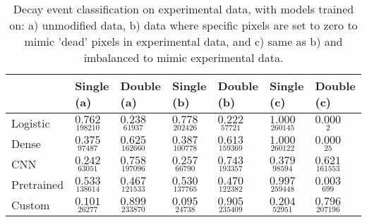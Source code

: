 \begin{table}
\centering
\caption{
Decay event classification on experimental data, with models trained on:
a) unmodified data, b) data where specific pixels are set to zero to mimic
'dead' pixels in experimental data, and c) same as b) and imbalanced to mimic experimental data.
}
\label{tab:classification-experimental-ratios}
\begin{tabular}{lllllll}
\toprule
{} &                                     Single (a) &                                     Double (a) &                                     Single (b) &                                     Double (b) &                                     Single (c) &                                     Double (c) \\
\midrule
Logistic   &  $\underset{\num{ 198210 }  }{\num{ 0.762 } }$ &  $\underset{\num{ 61937 }  }{\num{ 0.238 } }$ &  $\underset{\num{ 202426 }  }{\num{ 0.778 } }$ &  $\underset{\num{ 57721 }  }{\num{ 0.222 } }$ &  $\underset{\num{ 260145 }  }{\num{ 1.000 } }$ &  $\underset{\num{ 2 }  }{\num{ 0.000 } }$ \\
Dense      &  $\underset{\num{ 97487 }  }{\num{ 0.375 } }$ &  $\underset{\num{ 162660 }  }{\num{ 0.625 } }$ &  $\underset{\num{ 100778 }  }{\num{ 0.387 } }$ &  $\underset{\num{ 159369 }  }{\num{ 0.613 } }$ &  $\underset{\num{ 260122 }  }{\num{ 1.000 } }$ &  $\underset{\num{ 25 }  }{\num{ 0.000 } }$ \\
CNN        &  $\underset{\num{ 63051 }  }{\num{ 0.242 } }$ &  $\underset{\num{ 197096 }  }{\num{ 0.758 } }$ &  $\underset{\num{ 66790 }  }{\num{ 0.257 } }$ &  $\underset{\num{ 193357 }  }{\num{ 0.743 } }$ &  $\underset{\num{ 98594 }  }{\num{ 0.379 } }$ &  $\underset{\num{ 161553 }  }{\num{ 0.621 } }$ \\
Pretrained &  $\underset{\num{ 138614 }  }{\num{ 0.533 } }$ &  $\underset{\num{ 121533 }  }{\num{ 0.467 } }$ &  $\underset{\num{ 137765 }  }{\num{ 0.530 } }$ &  $\underset{\num{ 122382 }  }{\num{ 0.470 } }$ &  $\underset{\num{ 259448 }  }{\num{ 0.997 } }$ &  $\underset{\num{ 699 }  }{\num{ 0.003 } }$ \\
Custom     &  $\underset{\num{ 26277 }  }{\num{ 0.101 } }$ &  $\underset{\num{ 233870 }  }{\num{ 0.899 } }$ &  $\underset{\num{ 24738 }  }{\num{ 0.095 } }$ &  $\underset{\num{ 235409 }  }{\num{ 0.905 } }$ &  $\underset{\num{ 52951 }  }{\num{ 0.204 } }$ &  $\underset{\num{ 207196 }  }{\num{ 0.796 } }$ \\
\bottomrule
\end{tabular}
\end{table}
